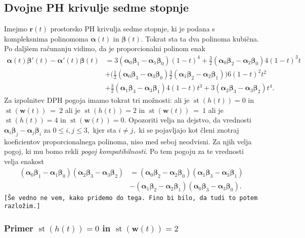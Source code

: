 \documentclass[12pt,a4paper,twoside]{article}
\theoremstyle{definition} %
\theoremstyle{plain} %
\numberwithin{equation}{section}  %
\newcommand{\rV}{\mathbf{r}}
\newcommand{\wV}{\mathbf{w}}
\newcommand{\balpha}{\boldsymbol \alpha}
\newcommand{\bbeta}{\boldsymbol \beta}
\DeclareMathOperator{\st}{st}
\begin{document}
\subsection{Dvojne PH krivulje sedme stopnje}

Imejmo $\rV(t)$ prostorsko PH krivulja sedme stopnje, ki je podana s kompleksnima polinomoma $\balpha(t)$ in $\bbeta(t).$ Tokrat sta ta dva polinoma kubična. Po daljšem računanju vidimo, da je proporcionalni polinom enak
\begin{align}
	\balpha(t)\bbeta'(t)-\balpha'(t)\bbeta(t)&=3(\balpha_0\bbeta_1-\balpha_1\bbeta_0)(1-t)^4+\frac{3}{2}(\balpha_0\bbeta_2-\balpha_2\bbeta_0)4(1-t)^3t\nonumber\\
	&+\big(\frac{1}{2}(\balpha_0\bbeta_3-\balpha_3\bbeta_0)\frac{3}{2}(\balpha_1\bbeta_2-\balpha_2\bbeta_1)\big)6(1-t)^2t^2\nonumber\\
	&+\frac{3}{2}(\balpha_1\bbeta_3-\balpha_3\bbeta_1)4(1-t)t^3+3(\balpha_2\bbeta_3-\balpha_3\bbeta_2)t^4. \label{propoly_bern_7}
\end{align}
Za izpolnitev DPH pogoja imamo tokrat tri možnosti: ali je $\st(h(t))=0$ in \\$\st(\wV(t))~=~2$ ali je $\st(h(t))=2$ in $\st(\wV(t))~=~1$ ali je $\st(h(t))=4$ in $\st(\wV(t))=0.$ Opozoriti velja na dejstvo, da vrednosti $\balpha_i\bbeta_j-\balpha_j\bbeta_i$ za $0\leq i,j\leq 3,$ kjer sta $i\neq j,$ ki se pojavljajo kot členi znotraj koeficientov proporcionalnega polinoma, niso med seboj neodvisni. Za njih velja pogoj, ki mu bomo rekli \emph{pogoj kompatibilnosti}. Po tem pogoju za te vrednosti velja enakost
\begin{align}
	(\balpha_0\bbeta_1-\balpha_1\bbeta_0)(\balpha_2\bbeta_3-\balpha_3\bbeta_2)&=(\balpha_0\bbeta_2-\balpha_2\bbeta_0)(\balpha_1\bbeta_3-\balpha_3\bbeta_1)\nonumber\\
	&-(\balpha_1\bbeta_2-\balpha_2\bbeta_1)(\balpha_0\bbeta_3-\balpha_3\bbeta_0).\label{pogoj_kompatibilnosti}
\end{align}
\texttt{[Še vedno ne vem, kako pridemo do tega. Fino bi bilo, da tudi to potem razložim.]}

\subsubsection*{Primer $\st(h(t))=0$ in $\st(\wV(t))=2$}
\end{document}
